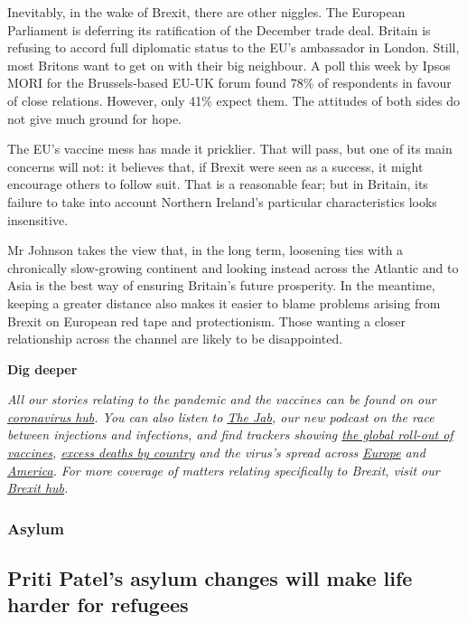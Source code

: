 \documentclass{article}
\begin{document}
Inevitably, in the wake of Brexit, there are other niggles. The European Parliament is deferring its ratification of the December trade deal. Britain is refusing to accord full diplomatic status to the EU's ambassador in London. Still, most Britons want to get on with their big neighbour. A poll this week by Ipsos MORI for the Brussels-based EU-UK forum found 78\% of respondents in favour of close relations. However, only 41\% expect them. The attitudes of both sides do not give much ground for hope. 

The EU's vaccine mess has made it pricklier. That will pass, but one of its main concerns will not: it believes that, if Brexit were seen as a success, it might encourage others to follow suit. That is a reasonable fear; but in Britain, its failure to take into account Northern Ireland's particular characteristics looks insensitive. 

Mr Johnson takes the view that, in the long term, loosening ties with a chronically slow-growing continent and looking instead across the Atlantic and to Asia is the best way of ensuring Britain's future prosperity. In the meantime, keeping a greater distance also makes it easier to blame problems arising from Brexit on European red tape and protectionism. Those wanting a closer relationship across the channel are likely to be disappointed.{} 

\textbf{Dig deeper} 

\emph{All our stories relating to the pandemic and the vaccines can be found on our \href{/news/2020/03/11/the-economists-coverage-of-the-coronavirus}{coronavirus hub}. You can also listen to \href{/podcasts/the-jab-a-new-podcast-from-the-economist}{The Jab}, our new podcast on the race between injections and infections, and find trackers showing \href{https://www.economist.com/graphic-detail/tracking-coronavirus-across-the-world}{the global roll-out of vaccines}, \href{https://www.economist.com/graphic-detail/coronavirus-excess-deaths-tracker}{excess deaths by country} and the virus's spread across \href{https://www.economist.com/graphic-detail/tracking-coronavirus-across-europe}{Europe} and \href{https://www.economist.com/graphic-detail/tracking-coronavirus-across-america}{America}.} \emph{For more coverage of matters relating specifically to Brexit, visit our \href{/brexit}{Brexit hub}.} 
\clearpage
\subsubsection{Asylum }
\subsection{Priti Patel's asylum changes will make life harder for refugees }
\end{document}

